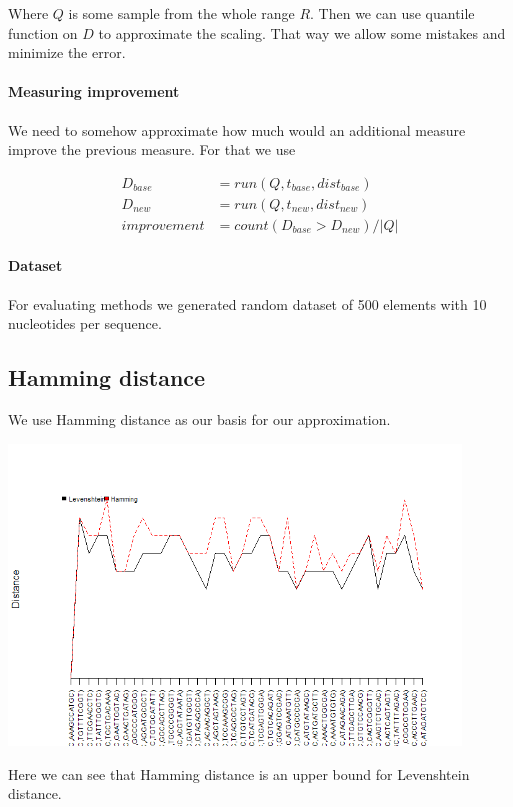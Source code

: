 \documentclass [12pt, a4]{article} %
\begin{document}
Where $Q$ is some sample from the whole range $R$. Then we can use quantile function on $D$ to approximate the scaling. That way we allow some mistakes and minimize the error.

\paragraph{Measuring improvement}

We need to somehow approximate how much would an additional measure improve the previous measure. For that we use

\begin{align*}
D_{base} &= run(Q, t_{base}, dist_{base}) \\
D_{new} &= run(Q, t_{new}, dist_{new}) \\
improvement &= count(D_{base} > D_{new} ) / |Q|
\end{align*}

\paragraph{Dataset}

For evaluating methods we generated random dataset of 500 elements with 10 nucleotides per sequence.

\subsection{Hamming distance}

We use Hamming distance as our basis for our approximation.

\includegraphics[width=0.9\textwidth]{img/hamming.png}

Here we can see that Hamming distance is an upper bound for Levenshtein distance.
\end{document}
